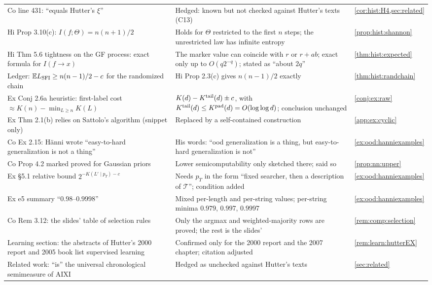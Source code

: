 {\begin{longtable}{@{}>{\raggedright\arraybackslash}p{5.1cm}>{\raggedright\arraybackslash}p{7.6cm}>{\raggedright\arraybackslash}p{2.6cm}@{}}
Co line 431: \SFIhist{} ``equals Hutter's $\xi$'' & Hedged: known but not checked against Hutter's texts (C13) & \cref{cor:hist:H4,sec:related}\\
Hi Prop 3.10(c): $I(f;\Theta)=n(n+1)/2$ & Holds for $\Theta$ restricted to the first $n$ steps; the unrestricted law has infinite entropy & \cref{prop:hist:shannon}\\
Hi Thm 5.6 tightness on the GF process: exact formula for $I(f\to x)$ & The marker value can coincide with $r$ or $r+ab$; exact only up to $O(q2^{-q})$; stated as ``about $2q$'' & \cref{thm:hist:expected}\\
Ledger: $\mathbb{E}L_{\mathrm{SFI}}\ge n(n-1)/2-c$ for the randomized chain & Hi Prop 2.3(c) gives $n(n-1)/2$ exactly & \cref{thm:hist:randchain}\\
Ex Conj 2.6a heuristic: first-label cost $\approx K(n)-\min_{L\ge n}K(L)$ & $K(d)-K^{\mathrm{tail}}(d)\pm c$, with $K^{\mathrm{tail}}(d)\le K^{\mathrm{pad}}(d)=O(\log\log d)$; conclusion unchanged & \cref{conj:ex:raw}\\
Ex Thm 2.1(b) relies on Sattolo's algorithm (snippet only) & Replaced by a self-contained construction & \cref{app:ex:cyclic}\\
Co Ex 2.15: H\"anni wrote ``easy-to-hard generalization is not a thing'' & His words: ``ood generalization is a thing, but easy-to-hard generalization is not'' & \cref{ex:ood:hanniexamples}\\
Co Prop 4.2 marked proved for Gaussian priors & Lower semicomputability only sketched there; said so & \cref{prop:nn:upper}\\
Ex \S5.1 relative bound $2^{-K(L'\mid p_T)-c}$ & Needs $p_T$ in the form ``fixed searcher, then a description of $\mathcal T$''; condition added & \cref{ex:ood:hanniexamples}\\
Ex e5 summary ``$0.98$--$0.9998$'' & Mixed per-length and per-string values; per-string minima $0.979$, $0.997$, $0.9997$ & \cref{ex:ood:hanniexamples}\\
Co Rem 3.12: the slides' table of selection rules & Only the argmax and weighted-majority rows are proved; the rest is the slides' & \cref{rem:comp:selection}\\
Learning section: the abstracts of Hutter's 2000 report and 2005 book list supervised learning & Confirmed only for the 2000 report and the 2007 chapter; citation adjusted & \cref{rem:learn:hutterEX}\\
Related work: \SFIhist{} ``is'' the universal chronological semimeasure of AIXI & Hedged as unchecked against Hutter's texts & \cref{sec:related}\\
\end{longtable}}

